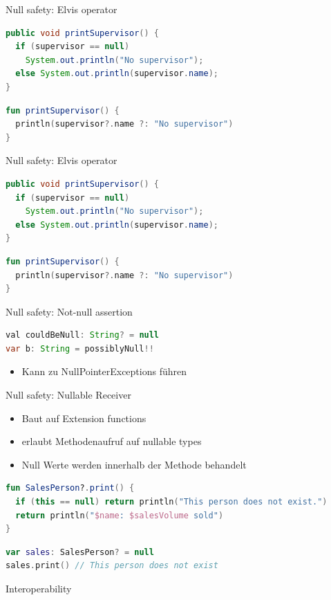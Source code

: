 \documentclass{beamer}
\begin{document}
\begin{frame}[fragile]{Null safety: Elvis operator}
  \begin{lstlisting}[language=Java]
public void printSupervisor() {
  if (supervisor == null)
    System.out.println("No supervisor");
  else System.out.println(supervisor.name);
}   
  \end{lstlisting}
  \begin{lstlisting}[language=Kotlin]
fun printSupervisor() {
  println(supervisor?.name ?: "No supervisor")
}
  \end{lstlisting}
\end{frame}

\begin{frame}[fragile]{Null safety: Elvis operator}
  \begin{lstlisting}[language=Java]
public void printSupervisor() {
  if (supervisor == null)
    System.out.println("No supervisor");
  else System.out.println(supervisor.name);
}
  \end{lstlisting}
  \begin{lstlisting}[language=Kotlin]
fun printSupervisor() {
  println(supervisor?.name ?: "No supervisor")
}
  \end{lstlisting}
\end{frame}

\begin{frame}[fragile]{Null safety: Not-null assertion}
  \begin{lstlisting}[language=Java]
val couldBeNull: String? = null
var b: String = possiblyNull!!
  \end{lstlisting}
  \begin{itemize}
    \item Kann zu NullPointerExceptions führen
  \end{itemize}
\end{frame}

\begin{frame}[fragile]{Null safety: Nullable Receiver}
  \begin{itemize}
    \item Baut auf Extension functions
    \item erlaubt Methodenaufruf auf nullable types
    \item Null Werte werden innerhalb der Methode behandelt
  \end{itemize}
  \begin{lstlisting}[language=Kotlin]
fun SalesPerson?.print() {
  if (this == null) return println("This person does not exist.")
  return println("$name: $salesVolume sold")
}
  \end{lstlisting}
  \begin{lstlisting}[language=Kotlin]
var sales: SalesPerson? = null
sales.print() // This person does not exist
  \end{lstlisting}
\end{frame}

\begin{frame}[fragile]{Interoperability}
  
\end{frame}
\end{document}
